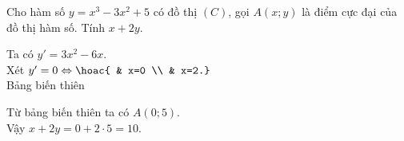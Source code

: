 \begin{bt}%
Cho hàm số $y=x^3-3x^2+5$ có đồ thị $(C)$, gọi $A(x;y)$ là điểm cực đại của đồ thị hàm số. Tính $x+2y$.
\loigiai
{
Ta có $y'=3x^2-6x$. \\
Xét $y'=0 \Leftrightarrow \hoac{ & x=0 \\ & x=2.}$ \\
Bảng biến thiên
\begin{center}
\end{center}
Từ bảng biến thiên ta có $A(0;5)$. \\
Vậy $x+2y=0+2\cdot5=10$.
}
\end{bt}

